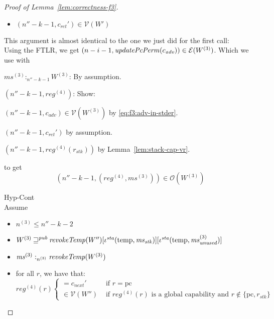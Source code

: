 \documentclass[a4paper]{article}
\newcommand{\var}[1]{\mathit{#1}}
\newcommand{\hs}{\var{ms}}
\newcommand{\ms}{\hs}
\newcommand{\pcreg}{\mathrm{pc}}
\newcommand{\reg}{\var{reg}}
\newcommand{\heap}{\var{mem}}
\newcommand{\adv}{\var{adv}}
\newcommand{\stk}{\var{stk}}
\newcommand{\sta}{\var{sta}}
\newcommand{\plainfun}[2]{
  \ifthenelse{\equal{#2}{}}
  {\mathit{#1}}
  {\mathit{#1}(#2)}
}
\newcommand{\updatePcPerm}[1]{\plainfun{updatePcPerm}{#1}}
\newcommand{\revokeTemp}[1]{\plainfun{revokeTemp}{#1}}
\newcommand{\futurewk}{\mathbin{\sqsupseteq}^{\var{pub}}}
\newcommand{\heapSat}[3][\heap]{#1 :_{#2} #3}
\newcommand{\memSat}[3][n]{\heapSat[#2]{#1}{#3}}
\newcommand{\asmType}{\plaindom{AsmType}}
\newcommand{\plaindom}[1]{\mathrm{#1}}
\newcommand{\intr}[2]{\mathcal{#1}}
\newcommand{\valueintr}[1]{\intr{V}{#1}}
\newcommand{\exprintr}[1]{\intr{E}{#1}}
\newcommand{\stdvr}{\valueintr{\asmType}}
\newcommand{\stder}{\exprintr{\asmType}}
\newcommand{\observations}{\mathcal{O}}
\newcommand{\npair}[2][n]{\left(#1,#2 \right)}
\newcommand{\plainview}[1]{\mathrm{#1}}
\newcommand{\temp}{\plainview{temp}}
\begin{document}
\begin{proof}[Proof of Lemma~\ref{lem:correctness-f3}]
\begin{enumproof}
\begin{enumproof}
\begin{enumproof}
\begin{enumproof}
\begin{itemize}
            \item $(n''-k-1,c_{\mathit{ret}}') \in \stdvr(W')$
            \end{itemize}
            This argument is almost identical to the one we just did for the first call:\\
            Using the FTLR, we get $\npair[n-i-1]{\updatePcPerm{c_\adv}} \in \stder(W^{(3)})$. Which we use with
            \begin{enumproof}
              \item $\memSat[n''-k-1]{\ms^{(3)}}{W^{(3)}}$: By assumption.
              \item $\npair[n''-k-1]{\reg^{(4)}}$: Show:
                \begin{enumproof}
                  \item $\npair[n''-k-1]{c_\adv} \in \stdvr(W^{(3)})$ by \ref{eq:f3:adv-in-stder}.
                  \item $\npair[n''-k-1]{c_{\mathit{ret}}'}$ by assumption.
                  \item $\npair[n''-k-1]{\reg^{(4)}(r_\stk)}$ by Lemma~\ref{lem:stack-cap-vr}.
                \end{enumproof}
            \end{enumproof}
            to get
            \[
              \npair[n''-k-1]{(\reg^{(4)},\ms^{(3)})} \in \observations(W^{(3)})
            \]
          \item Hyp-Cont\\
            Assume
            \begin{itemize}
            \item $n^{(3)} \leq n''-k-2$
            \item $W^{(3)} \futurewk \revokeTemp{W''}[\iota^{\sta}(\temp,\ms_\stk)][\iota^\sta(\temp,\ms_{\mathit{unused}}^{(3)})]$
            \item $\memSat[n^{(3)}]{\ms^{(3)}}{\revokeTemp{W^{(3)}}}$ 
            \item for all $r$, we have that:
              \begin{equation*}
                \reg^{(4)}(r)
                \begin{cases}
                  = c_{\mathit{next}}' &\text{ if } r = \pcreg\\
                  \in \stdvr(W'') &\text{ if $\reg^{(4)}(r)$ is a global capability and } r \not\in \{\pcreg, r_\stk\}
                \end{cases}
              \end{equation*}

\end{itemize}
\end{enumproof}
\end{enumproof}
\end{enumproof}
\end{enumproof}
\end{proof}
\end{document}
